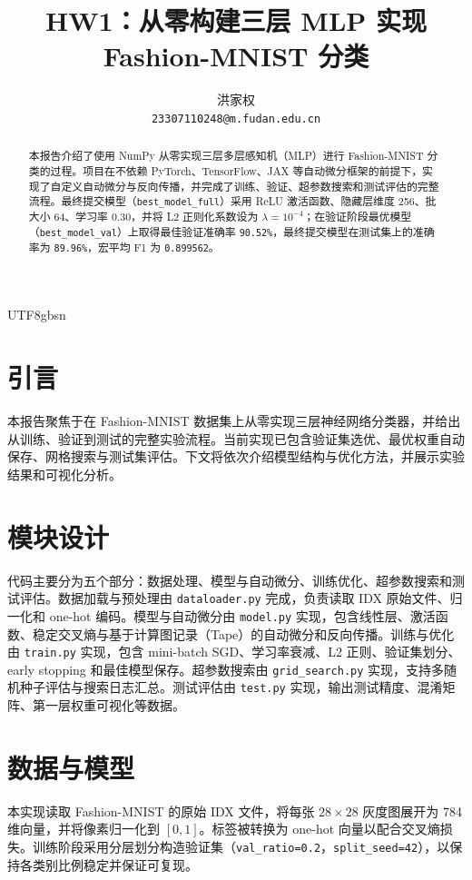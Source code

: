\documentclass[11pt]{article}
\title{HW1：从零构建三层 MLP 实现 Fashion-MNIST 分类}
\author{
  洪家权 \\
  \texttt{23307110248@m.fudan.edu.cn}
}
\begin{document}
\ifXeTeX\else\begin{CJK*}{UTF8}{gbsn}\fi
\maketitle

\begin{abstract}
本报告介绍了使用 NumPy 从零实现三层多层感知机（MLP）进行 Fashion-MNIST 分类的过程。项目在不依赖 PyTorch、TensorFlow、JAX 等自动微分框架的前提下，实现了自定义自动微分与反向传播，并完成了训练、验证、超参数搜索和测试评估的完整流程。最终提交模型（\texttt{best\_model\_full}）采用 ReLU 激活函数、隐藏层维度 256、批大小 64、学习率 0.30，并将 L2 正则化系数设为 $\lambda=10^{-4}$；在验证阶段最优模型（\texttt{best\_model\_val}）上取得最佳验证准确率 \texttt{90.52\%}，最终提交模型在测试集上的准确率为 \texttt{89.96\%}，宏平均 F1 为 \texttt{0.899562}。
\end{abstract}

\section{引言}
本报告聚焦于在 Fashion-MNIST 数据集上从零实现三层神经网络分类器，并给出从训练、验证到测试的完整实验流程。当前实现已包含验证集选优、最优权重自动保存、网格搜索与测试集评估。下文将依次介绍模型结构与优化方法，并展示实验结果和可视化分析。

\section{模块设计}
代码主要分为五个部分：数据处理、模型与自动微分、训练优化、超参数搜索和测试评估。数据加载与预处理由 \texttt{dataloader.py} 完成，负责读取 IDX 原始文件、归一化和 one-hot 编码。模型与自动微分由 \texttt{model.py} 实现，包含线性层、激活函数、稳定交叉熵与基于计算图记录（Tape）的自动微分和反向传播。训练与优化由 \texttt{train.py} 实现，包含 mini-batch SGD、学习率衰减、L2 正则、验证集划分、early stopping 和最佳模型保存。超参数搜索由 \texttt{grid\_search.py} 实现，支持多随机种子评估与搜索日志汇总。测试评估由 \texttt{test.py} 实现，输出测试精度、混淆矩阵、第一层权重可视化等数据。

\section{数据与模型}
本实现读取 Fashion-MNIST 的原始 IDX 文件，将每张 $28\times 28$ 灰度图展开为 784 维向量，并将像素归一化到 $[0,1]$。标签被转换为 one-hot 向量以配合交叉熵损失。训练阶段采用分层划分构造验证集（\texttt{val\_ratio=0.2}，\texttt{split\_seed=42}），以保持各类别比例稳定并保证可复现。


\end{CJK*}
\end{document}
